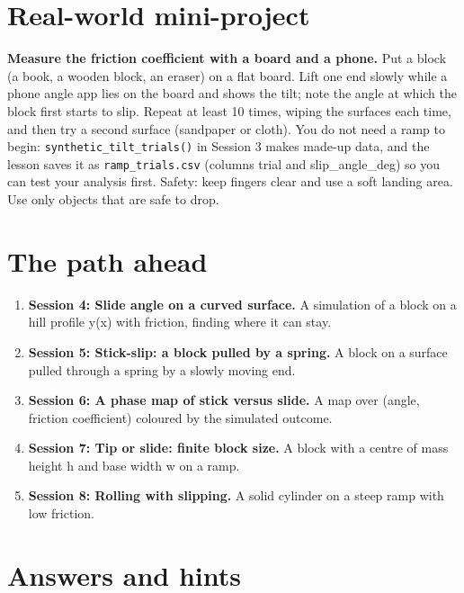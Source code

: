 \documentclass[11pt,a4paper]{article}
\begin{document}
\section{Real-world mini-project}
\textbf{Measure the friction coefficient with a board and a phone.} Put a block (a book, a wooden block, an eraser) on a flat board. Lift one end slowly while a phone angle app lies on the board and shows the tilt; note the angle at which the block first starts to slip. Repeat at least 10 times, wiping the surfaces each time, and then try a second surface (sandpaper or cloth). You do not need a ramp to begin: \texttt{synthetic\_tilt\_trials()} in Session 3 makes made-up data, and the lesson saves it as \texttt{ramp\_trials.csv} (columns trial and slip\_angle\_deg) so you can test your analysis first. Safety: keep fingers clear and use a soft landing area. Use only objects that are safe to drop.

\section{The path ahead}
\begin{enumerate}[nosep]
\item \textbf{Session 4: Slide angle on a curved surface.} A simulation of a block on a hill profile y(x) with friction, finding where it can stay.
\item \textbf{Session 5: Stick-slip: a block pulled by a spring.} A block on a surface pulled through a spring by a slowly moving end.
\item \textbf{Session 6: A phase map of stick versus slide.} A map over (angle, friction coefficient) coloured by the simulated outcome.
\item \textbf{Session 7: Tip or slide: finite block size.} A block with a centre of mass height h and base width w on a ramp.
\item \textbf{Session 8: Rolling with slipping.} A solid cylinder on a steep ramp with low friction.
\end{enumerate}

\section{Answers and hints}
\end{document}

